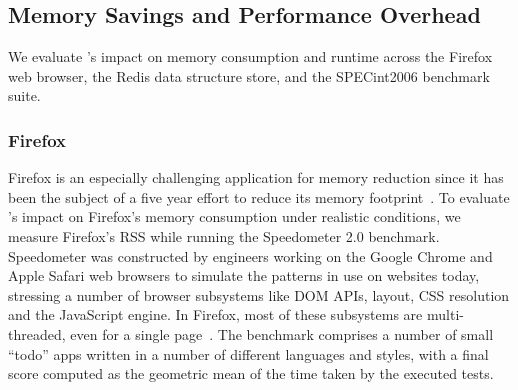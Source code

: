 \subsection{Memory Savings and Performance Overhead}
\label{sec:evaluation:overallmemory}

We evaluate \Mesh{}'s impact on memory consumption and runtime across
the Firefox web browser, the Redis data structure store, and the
SPECint2006 benchmark suite.

\subsubsection{Firefox}
\label{sec:firefox}

Firefox is an especially challenging application for memory reduction
since it has been the subject of a five year effort to reduce its
memory footprint~\cite{awsy}. To evaluate \Mesh{}'s impact on
Firefox's memory consumption under realistic conditions, we measure
Firefox's RSS while running the Speedometer 2.0 benchmark.
Speedometer was constructed by engineers working on the Google Chrome
and Apple Safari web browsers to simulate the patterns in use on
websites today, stressing a number of browser subsystems like DOM
APIs, layout, CSS resolution and the JavaScript engine.  In Firefox,
most of these subsystems are multi-threaded, even for a single
page~\cite{ff:quantum}.  The benchmark comprises a number of small
``todo'' apps written in a number of different languages and styles,
with a final score computed as the geometric mean of the time taken by
the executed tests.


